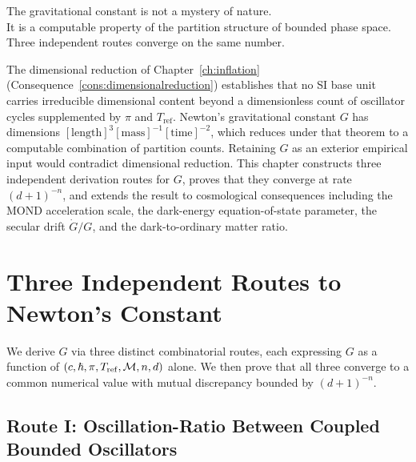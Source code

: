 
\epigraph{%
  The gravitational constant is not a mystery of nature.\\
  It is a computable property of the partition structure of bounded phase space.\\
  Three independent routes converge on the same number.%
}{}

\noindent
The dimensional reduction of Chapter~\ref{ch:inflation} (Consequence~\ref{cons:dimensionalreduction})
establishes that no SI base unit carries irreducible dimensional content beyond
a dimensionless count of oscillator cycles supplemented by $\pi$ and
$T_{\mathrm{ref}}$.
Newton's gravitational constant $G$ has dimensions
$[\mathrm{length}]^{3}[\mathrm{mass}]^{-1}[\mathrm{time}]^{-2}$, which reduces
under that theorem to a computable combination of partition counts.
Retaining $G$ as an exterior empirical input would contradict dimensional
reduction.
This chapter constructs three independent derivation routes for $G$, proves
that they converge at rate $(d+1)^{-n}$, and extends the result to cosmological
consequences including the MOND acceleration scale, the dark-energy
equation-of-state parameter, the secular drift $\dot{G}/G$, and the
dark-to-ordinary matter ratio.

\section{Three Independent Routes to Newton's Constant}
\label{sec:ch20-threeroutes}

We derive $G$ via three distinct combinatorial routes, each expressing $G$ as a
function of $(c, \hslash, \pi, T_{\mathrm{ref}}, \mathcal{M}, n, d)$ alone.
We then prove that all three converge to a common numerical value with mutual
discrepancy bounded by $(d+1)^{-n}$.

\subsection{Route I: Oscillation-Ratio Between Coupled Bounded Oscillators}
\label{sec:ch20-routeI}

